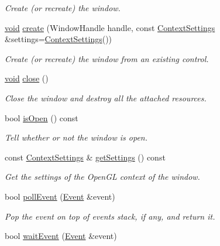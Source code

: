 \begin{DoxyCompactItemize}
\begin{DoxyCompactList}\small\item\em Create (or recreate) the window. \end{DoxyCompactList}\item 
\hyperlink{glutf90_8h_ac778d6f63f1aaf8ebda0ce6ac821b56e}{void} \hyperlink{classsf_1_1_window_acf67483dc21f08d65c8835b3889b41b2}{create} (Window\-Handle handle, const \hyperlink{structsf_1_1_context_settings}{Context\-Settings} \&settings=\hyperlink{structsf_1_1_context_settings}{Context\-Settings}())
\begin{DoxyCompactList}\small\item\em Create (or recreate) the window from an existing control. \end{DoxyCompactList}\item 
\hyperlink{glutf90_8h_ac778d6f63f1aaf8ebda0ce6ac821b56e}{void} \hyperlink{classsf_1_1_window_a99d1e030387b0c26f5995670504fe7b5}{close} ()
\begin{DoxyCompactList}\small\item\em Close the window and destroy all the attached resources. \end{DoxyCompactList}\item 
bool \hyperlink{classsf_1_1_window_a5aa9c2b2b0e51d3423c2b66c80253337}{is\-Open} () const 
\begin{DoxyCompactList}\small\item\em Tell whether or not the window is open. \end{DoxyCompactList}\item 
const \hyperlink{structsf_1_1_context_settings}{Context\-Settings} \& \hyperlink{classsf_1_1_window_a5a9d5c15facf25ad4d9b2b30caa0a2db}{get\-Settings} () const 
\begin{DoxyCompactList}\small\item\em Get the settings of the Open\-G\-L context of the window. \end{DoxyCompactList}\item 
bool \hyperlink{classsf_1_1_window_a338e996585faf82e93069858e3b531b7}{poll\-Event} (\hyperlink{classsf_1_1_event}{Event} \&event)
\begin{DoxyCompactList}\small\item\em Pop the event on top of events stack, if any, and return it. \end{DoxyCompactList}\item 
bool \hyperlink{classsf_1_1_window_aaf02ab64fbc1d374eef3696df54137bc}{wait\-Event} (\hyperlink{classsf_1_1_event}{Event} \&event)

\end{DoxyCompactItemize}
